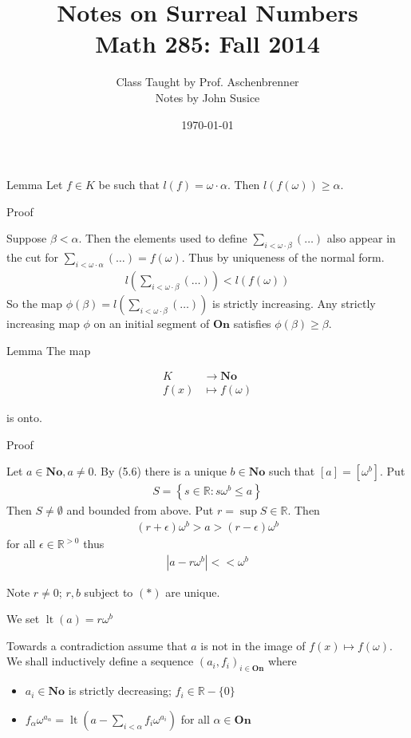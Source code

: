 \documentclass{article}
\title{Notes on Surreal Numbers \\ Math 285: Fall 2014}
\author{Class Taught by Prof. Aschenbrenner \\ Notes by John Susice}
\date{\today}
\newcommand{\R}{\mathbb{R}}
\newcommand{\No}{\mathbf{No}}
\newcommand{\On}{\mathbf{On}}
\newcommand{\paren}[1]{\left( #1 \right)}
\newcommand{\brac}[1]{\left[ #1 \right]}
\newcommand{\curly}[1]{\left\{ #1 \right\}}
\newcommand{\abs}[1]{\left| #1 \right|}
\newcommand{\arr}{\rightarrow}
\DeclareMathOperator{\lt}{lt}
\newcommand{\w}{\omega}
\begin{document}
\maketitle{}

Lemma Let $f \in K$ be such that $l(f) = \w \cdot \alpha$. Then $l(f(\w)) \geq \alpha$.

Proof

Suppose $\beta < \alpha$. Then the elements used to define $\sum_{i < \w\cdot\beta} (\ldots)$ also appear in the cut for $\sum_{i < \w\cdot\alpha} (\ldots) = f(\w)$. Thus by uniqueness of the normal form.
\begin{align*}
	l\paren{\sum_{i < \w\cdot\beta} (\ldots)} < l(f(\w))
\end{align*}
So the map $\phi(\beta) = l(\sum_{i < \w\cdot\beta} (\ldots))$ is strictly increasing.
Any strictly increasing map $\phi$ on an initial segment of $\On$ satisfies $\phi(\beta) \geq \beta$.


Lemma The map

\begin{align*}
	K &\arr \No \\
	f(x) &\mapsto f(\w)
\end{align*}

is onto.

Proof

Let $a \in \No, a \neq 0$. By (5.6) there is a unique $b \in \No$ such that $\brac{a} = \brac{\w^b}$.
Put
\begin{align*}
	S = \curly{s \in \R \colon s\w^b \leq a}
\end{align*}
Then $S \neq \emptyset$ and bounded from above.
Put $r = \sup S \in \R$.
Then
\begin{align*}
	(r + \epsilon)\w^b > a > (r - \epsilon)\w^b
\end{align*}
for all $\epsilon \in \R^{>0}$
thus
\begin{align*}
	\abs{a - r\w^b} << \w^b \tag{*}
\end{align*}

Note $r \neq 0$; $r,b$ subject to $(*)$ are unique.

We set $\lt(a) = r\w^b$

Towards a contradiction assume that $a$ is not in the image of $f(x) \mapsto f(\w)$.
We shall inductively define a sequence $(a_i, f_i)_{i \in \On}$ where 

\begin{itemize}
	\item $a_i \in \No$ is strictly decreasing; $f_i \in \R - \{0\}$
	\item $f_\alpha \w^{a_\alpha} = \lt\paren{a - \sum_{i < \alpha} f_i\w^{a_i}}$ for all $\alpha \in \On$
\end{itemize}
\end{document}
